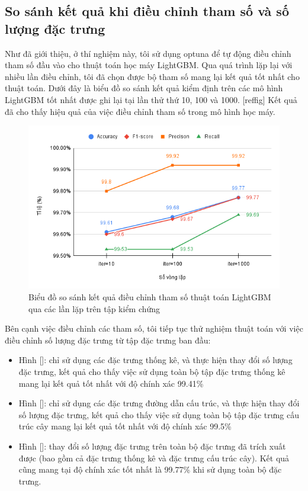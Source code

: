 \documentclass[./../main.tex]{subfiles}
\begin{document}
\subsection{So sánh kết quả khi điều chỉnh tham số và số lượng đặc trưng}
Như đã giới thiệu, ở thí nghiệm này, tôi sử dụng optuna để tự động điều chỉnh tham số đầu vào cho thuật toán học máy LightGBM. Qua quá trình lặp lại với nhiều lần điều chỉnh, tôi đã chọn được bộ tham số mang lại kết quả tốt nhất cho thuật toán. Dưới đây là biểu đồ so sánh kết quả kiểm định trên các mô hình LightGBM tốt nhất được ghi lại tại lần thử thứ 10, 100 và 1000. [ref{fig}] Kết quả đã cho thấy hiệu quả của việc điều chỉnh tham số trong mô hình học máy.

\begin{figure}[H]
	\centering
	\includegraphics[width=\linewidth]{./images/exp1_trials.png}
	\caption{Biểu đồ so sánh kết quả điều chỉnh tham số thuật toán LightGBM qua các lần lặp trên tập kiểm chứng}
	\label{fig:exp1_trials}
\end{figure}

Bên cạnh việc điều chỉnh các tham số, tôi tiếp tục thử nghiệm thuật toán với việc điều chỉnh số lượng đặc trưng từ tập đặc trưng ban đầu:

\begin{itemize}
	\item
	      Hình []: chỉ sử dụng các đặc trưng thống kê, và thực hiện thay đổi số lượng đặc trưng, kết quả cho thấy việc sử dụng toàn bộ tập đặc trưng thống kê mang lại kết quả tốt nhất với độ chính xác 99.41\%
	\item
	      Hình []: chỉ sử dụng các đặc trưng đường dẫn cấu trúc, và thực hiện thay đổi số lượng đặc trưng, kết quả cho thấy việc sử dụng toàn bộ tập đặc trưng cấu trúc cây mang lại kết quả tốt nhất với độ chính xác 99.5\%
	\item
	      Hình []: thay đổi số lượng đặc trưng trên toàn bộ đặc trưng đã trích xuất được (bao gồm cả đặc trưng thống kê và đặc trưng cấu trúc cây). Kết quả cũng mang tại độ chính xác tốt nhất là 99.77\% khi sử dụng toàn bộ đặc trưng.
\end{itemize}
\end{document}
